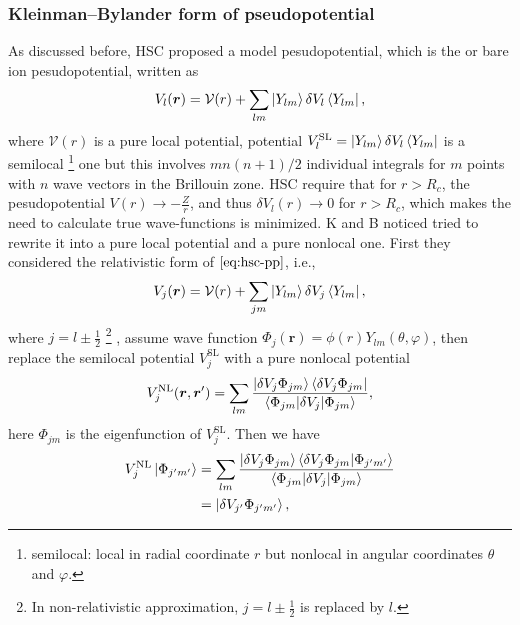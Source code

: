 
\subsubsection{Kleinman--Bylander form of pseudopotential}
As discussed before,
HSC proposed a model pesudopotential, which is the or bare ion pesudopotential, written as
\begin{equation}\label{eq:hsc-pp}
	V_l(\bm{r}) = \mathcal{V} (r) + \sum_{l m} \ket{Y_{lm}} \delta V_l \bra{Y_{lm}},
\end{equation}
where $\mathcal{V} (r)$ is a pure local potential, potential
$V_l^\text{SL} = \ket{Y_{lm}} \delta V_l \bra{Y_{lm}}$ is a semilocal
\footnote{
	semilocal: local in radial coordinate $r$ but nonlocal in angular coordinates $\theta$ and $\varphi$.
}
one but this involves $m n (n+1) / 2$ individual integrals for $m$ points
with $n$ wave vectors in the Brillouin zone.
HSC require that for $r > R_c$, the pesudopotential
$V (r) \rightarrow - \frac{ Z }{ r }$, and thus
$\delta V_l (r) \rightarrow 0 $ for $r > R_c$,
which makes the need to calculate true wave-functions is minimized.
K and B \cite{Kleinman:1982cx} noticed tried to rewrite it into a pure local potential and a pure
nonlocal one. First they considered the relativistic form of $\eqref{eq:hsc-pp}$,
i.e.,
\begin{equation}
	V_j(\bm{r}) = \mathcal{V} (r) + \sum_{jm} \ket{Y_{lm}} \delta V_j \bra{Y_{lm}},
\end{equation}
where $j = l \pm \frac{ 1 }{ 2 }$
\footnote{
	In non-relativistic approximation, $j = l \pm \frac{ 1 }{ 2 }$ is replaced by $l$.
}
, assume wave function
$\Phi_j (\bm{r}) = \phi(r) Y_{lm} (\theta, \varphi)$,
then replace the semilocal potential $V_j^\text{SL}$ with a pure nonlocal potential
\begin{equation}\label{eq:nl-pp}
	V_j^\text{NL} (\bm{r}, \bm{r}')
	= \sum_{lm} \frac{ \ket{\delta V_j \Phi_{jm}}  \bra{\delta V_j \Phi_{jm}} }{
		\braket{ \Phi_{jm} | \delta V_j | \Phi_{jm} } },
\end{equation}
here $\Phi_{jm}$ is the eigenfunction of $V_j^\text{SL}$.
Then we have
\begin{equation}\label{eq:vnl-phi}
	\begin{split}
		V_j^\text{NL} \ket{\Phi_{j'm'}}
		&=
		\sum_{lm} \frac{
			\ket{\delta V_j \Phi_{jm}}  \braket{\delta V_j \Phi_{jm} | \Phi_{j'm'} }
		}{
			\braket{ \Phi_{jm} | \delta V_j | \Phi_{jm} }
		} \\
		&= \ket{ \delta V_{j'} \Phi_{j'm'} },
	\end{split}
\end{equation}
